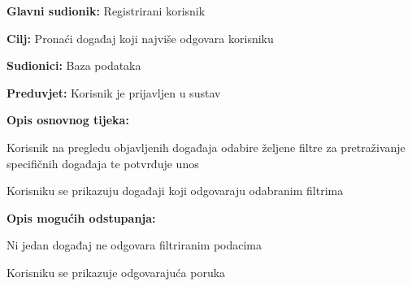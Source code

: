 				
				\noindent {}
				\begin{packed_item}
					
					\item \textbf{Glavni sudionik:} Registrirani korisnik
					\item  \textbf{Cilj:} Pronaći događaj koji najviše odgovara korisniku
					\item  \textbf{Sudionici:} Baza podataka
					\item  \textbf{Preduvjet:} Korisnik je prijavljen u sustav
					\item  \textbf{Opis osnovnog tijeka:}
					
					\item[] \begin{packed_enum}
						
						\item  Korisnik na pregledu objavljenih događaja odabire željene filtre za pretraživanje specifičnih događaja te potvrđuje unos
						\item Korisniku se prikazuju događaji koji odgovaraju odabranim filtrima
						
					\end{packed_enum}
					
					\item  \textbf{Opis mogućih odstupanja:}
					
					\item[] \begin{packed_item}
						
						\item[2.a] Ni jedan događaj ne odgovara filtriranim podacima
						\item[] \begin{packed_enum}
							
							\item Korisniku se prikazuje odgovarajuća poruka
							
						\end{packed_enum}
						
					\end{packed_item}
				\end{packed_item}
				
